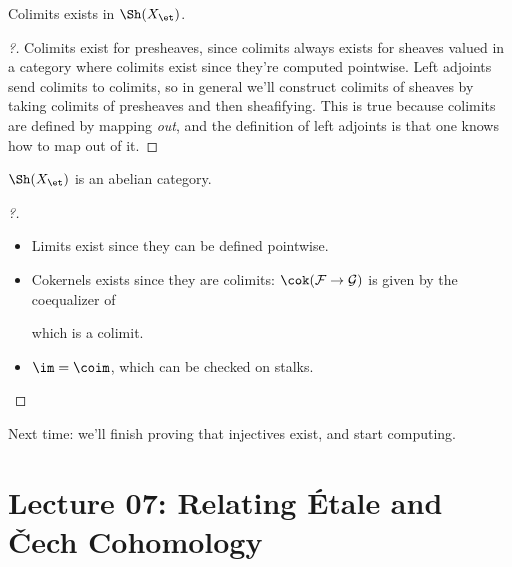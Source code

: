 \begin{corollary}[?]

Colimits exists in \(\Sh(X_\et)\).

\end{corollary}

\begin{proof}[?]

Colimits exist for presheaves, since colimits always exists for sheaves
valued in a category where colimits exist since they're computed
pointwise. Left adjoints send colimits to colimits, so in general we'll
construct colimits of sheaves by taking colimits of presheaves and then
sheafifying. This is true because colimits are defined by mapping
\emph{out}, and the definition of left adjoints is that one knows how to
map out of it.

\end{proof}

\begin{corollary}

\(\Sh(X_\et)\) is an abelian category.

\end{corollary}

\begin{proof}[?]

\envlist

\begin{itemize}
\item
  Limits exist since they can be defined pointwise.
\item
  Cokernels exists since they are colimits:
  \(\cok(\mathcal{F} \to \mathcal{G})\) is given by the coequalizer of

  \begin{center}
  \end{center}

  which is a colimit.
\item
  \(\im = \coim\), which can be checked on stalks.
\end{itemize}

\end{proof}

Next time: we'll finish proving that injectives exist, and start
computing.

\hypertarget{lecture-07-relating-uxe9tale-and-ux10dech-cohomology}{%
\section{Lecture 07: Relating Étale and Čech
Cohomology}\label{lecture-07-relating-uxe9tale-and-ux10dech-cohomology}}

